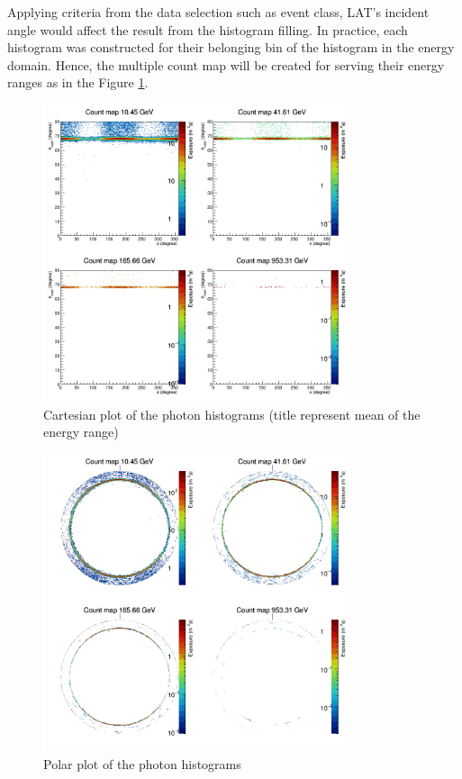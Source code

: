 Applying criteria from the data selection such as event class, LAT's incident angle would affect the result from the histogram filling.
In practice, each histogram was constructed for their belonging bin 
of the histogram in the energy domain. Hence, the multiple count map 
will be created for serving their energy ranges as in the
Figure \ref{fig:cntmap_cartesian}.

\begin{figure}[h!]
    \centering
    \includegraphics[width=0.8\textwidth]{content/result_and_discussion/figures/cartesian_cntmaps.png}
    \caption{Cartesian plot of the photon histograms (title represent mean of the energy range)}
    \label{fig:cntmap_cartesian}
\end{figure}


\begin{figure}[h!]
    \centering
    \includegraphics[width=0.8\textwidth]{content/result_and_discussion/figures/polar_cntmaps.png}
    \caption{Polar plot of the photon histograms}
    \label{fig:cntmap_polar}
\end{figure}


